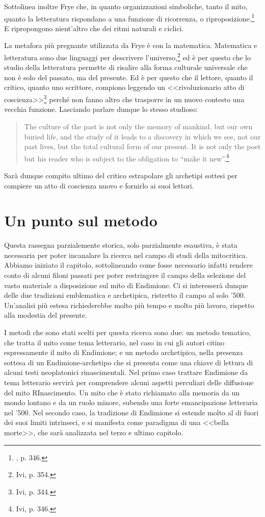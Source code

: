 \documentclass[12pt,a4paper,openright, oneside]{book}
\begin{document}
Sottolinea inoltre Frye che, in quanto organizzazioni simboliche, tanto il mito, quanto la letteratura rispondano a una funzione di ricorrenza, o riproposizione.\footnote{\cite{Frye}, p. 346.} E ripropongono nient'altro che dei ritmi naturali e ciclici.

La metafora più pregnante utilizzata da Frye è con la matematica. Matematica e letteratura sono due linguaggi per descrivere l'universo,\footnote{Ivi, p. 354.} ed è per questo che lo studio della letteratura permette di risalire alla forma culturale universale che non è solo del passato, ma del presente. 
Ed è per questo che il lettore, quanto il critico, quanto uno scrittore, compiono leggendo un <<rivoluzionario atto di coscienza>>\footnote{Ivi, p. 344.} perché non fanno altro che trasporre in un nuovo contesto una vecchia funzione. Lasciando parlare dunque lo stesso studioso:
\begin{quote}
The culture of the past is not only the memory of mankind, but our own buried life, and the study of it leads to a discovery in which we see, not our past lives, but the total cultural form of our present. It is not only the poet but his reader who is subject to the obligation to ``make it new''.\footnote{Ivi, p. 346.}
\end{quote}

Sarà dunque compito ultimo del critico estrapolare gli archetipi sottesi per compiere un atto di coscienza nuovo e fornirlo ai suoi lettori.

\section{Un punto sul metodo}

Questa rassegna parzialemente storica, solo parzialmente esaustiva, è stata necessaria per poter incanalare la ricerca nel campo di studi della mitocritica. Abbiamo iniziato il capitolo, sottolineando come fosse necessario infatti rendere conto di alcuni filoni passati per poter restringere il campo della selezione del vasto materiale a disposizione sul mito di Endimione. Ci si interesserà dunque delle due tradizioni emblematica e archetipica, ristretto il campo al solo '500. Un'analisi più estesa richiederebbe molto più tempo e molto più lavoro, rispetto alla modestia del presente. 

I metodi che sono stati scelti per questa ricerca sono due: un metodo tematico, che tratta il mito come tema letterario, nel caso in cui gli autori citino espressamente il mito di Endimione; e un metodo archetipico, nella presenza sottesa di un Endimione-archetipo che si presenta come una chiave di lettura di alcuni testi neoplatonici rinascimentali. Nel primo caso trattare Endimione da tema letterario servirà per comprendere alcuni aspetti perculiari delle diffusione del mito RInascimento. Un mito che è stato richiamato alla memoria da un mondo lontano e da un ruolo minore, subendo una forte emancipazione letteraria nel '500. Nel secondo caso, la tradizione di Endimione si estende molto al di fuori dei suoi limiti intrinseci, e si manifesta come paradigma di una <<bella morte>>, che sarà analizzata nel terzo e ultimo capitolo.
\end{document}
